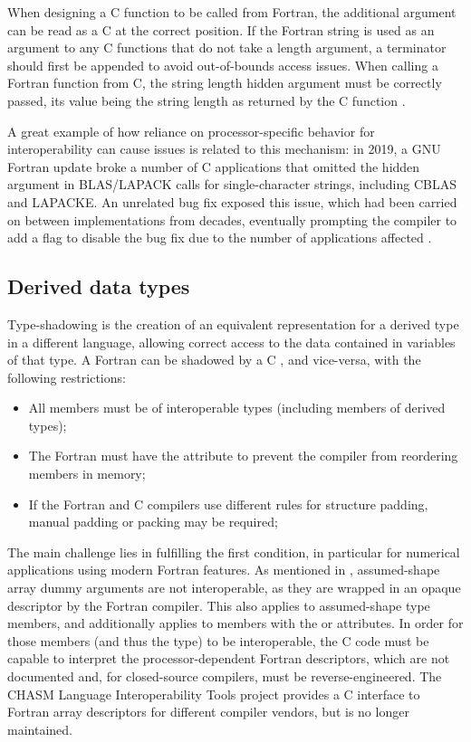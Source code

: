 When designing a C function to be called from Fortran, the additional argument can be read as a C  at the correct position. If the Fortran string is used as an argument to any C functions that do not take a length argument, a  terminator should first be appended to avoid out-of-bounds access issues. When calling a Fortran function from C, the string length hidden argument must be correctly passed, its value being the string length as returned by the C function .

A great example of how reliance on processor-specific behavior for interoperability can cause issues is related to this mechanism: in 2019, a GNU Fortran update broke a number of C applications that omitted the hidden argument in BLAS/LAPACK calls for single-character strings, including CBLAS and LAPACKE. An unrelated bug fix exposed this issue, which had been carried on between implementations from decades, eventually prompting the compiler to add a flag to disable the bug fix due to the number of applications affected \cite{kalibera2019gfortran,corbet2019scstrings}.

\subsection{Derived data types} \label{sec:interop_f90_derived}

Type-shadowing is the creation of an equivalent representation for a derived type in a different language, allowing correct access to the data contained in variables of that type. A Fortran  can be shadowed by a C , and vice-versa, with the following restrictions\cite{pletzer2008exposing}:

\begin{itemize}
	\item All members must be of interoperable types (including members of derived types); 
	\item The Fortran  must have the  attribute to prevent the compiler from reordering members in memory;
	\item If the Fortran and C compilers use different rules for structure padding, manual padding or packing may be required;
\end{itemize}

The main challenge lies in fulfilling the first condition, in particular for numerical applications using modern Fortran features. As mentioned in , assumed-shape array dummy arguments are not interoperable, as they are wrapped in an opaque descriptor by the Fortran compiler. This also applies to assumed-shape type members, and additionally applies to members with the  or  attributes. In order for those members (and thus the type) to be interoperable, the C code must be capable to interpret the processor-dependent Fortran descriptors, which are not documented and, for closed-source compilers, must be reverse-engineered. The CHASM Language Interoperability Tools \cite{rasmussen2001chasm} project provides a C interface to Fortran array descriptors for different compiler vendors, but is no longer maintained.


